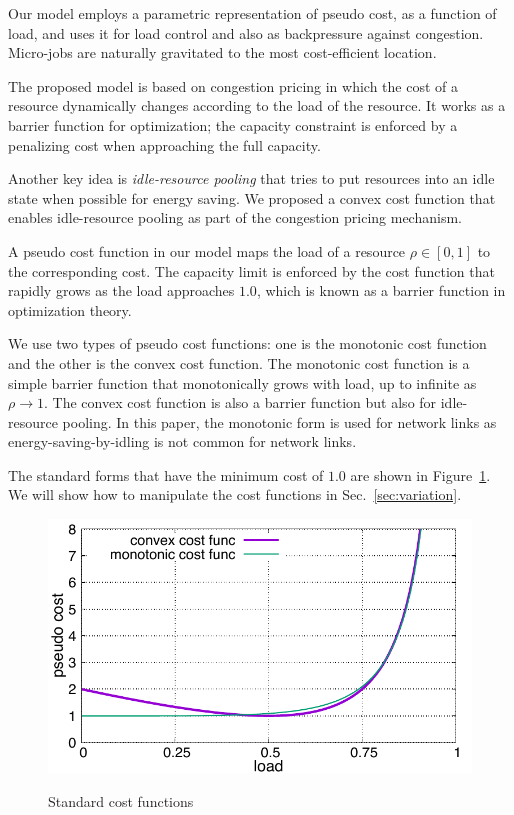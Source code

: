 
Our model employs a parametric representation of pseudo cost, as a
function of load, and uses it for load control and also as
backpressure against congestion.
Micro-jobs are naturally gravitated to the most cost-efficient
location.

The proposed model is based on congestion pricing in which the cost of
a resource dynamically changes according to the load of the resource.
It works as a barrier function for optimization; the capacity
constraint is enforced by a penalizing cost when approaching the full
capacity.

Another key idea is {\em idle-resource pooling} that tries to put resources
into an idle state when possible for energy saving.
We proposed a convex cost function that enables idle-resource pooling
as part of the congestion pricing mechanism.

A pseudo cost function in our model maps the load of a resource
$\rho \in [0, 1]$ to the corresponding cost.
The capacity limit is enforced by the cost function that rapidly grows
as the load approaches $1.0$, which is known as a barrier function in
optimization theory. 

We use two types of pseudo cost functions: one is the monotonic cost
function and the other is the convex cost function.
The monotonic cost function is a simple barrier function that
monotonically grows with load, up to infinite as $\rho \to 1$.
The convex cost function is also a barrier function but also for
idle-resource pooling.
In this paper, the monotonic form is used for network links as
energy-saving-by-idling is not common for network links.

The standard forms that have the minimum cost of $1.0$ are
shown in Figure~\ref{fig:std_costfunc}. We will show how to manipulate
the cost functions in Sec.~\ref{sec:variation}.

\begin{figure}[tb]
  \begin{center}
    \includegraphics[width=1.0\columnwidth]{costfunc.pdf}
    \vspace{-2.0ex}
    \caption{Standard cost functions}
    \label{fig:std_costfunc}
  \end{center}
\end{figure}

